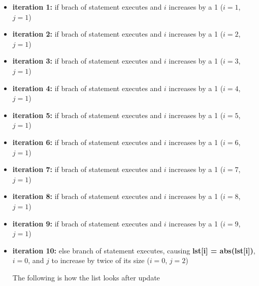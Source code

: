 \documentclass[12pt]{article}
\begin{document}
\begin{enumerate}[a.]
\begin{itemize}
        \begin{itemize}
            \item \textbf{iteration 1:} if brach of statement executes and $i$ increases
            by a 1 ($i = 1$, $j = 1$)
            \item \textbf{iteration 2:} if brach of statement executes and $i$ increases
            by a 1 ($i = 2$, $j = 1$)
            \item \textbf{iteration 3:} if brach of statement executes and $i$ increases
            by a 1 ($i = 3$, $j = 1$)
            \item \textbf{iteration 4:} if brach of statement executes and $i$ increases
            by a 1 ($i = 4$, $j = 1$)
            \item \textbf{iteration 5:} if brach of statement executes and $i$ increases
            by a 1 ($i = 5$, $j = 1$)
            \item \textbf{iteration 6:} if brach of statement executes and $i$ increases
            by a 1 ($i = 6$, $j = 1$)
            \item \textbf{iteration 7:} if brach of statement executes and $i$ increases
            by a 1 ($i = 7$, $j = 1$)
            \item \textbf{iteration 8:} if brach of statement executes and $i$ increases
            by a 1 ($i = 8$, $j = 1$)
            \item \textbf{iteration 9:} if brach of statement executes and $i$ increases
            by a 1 ($i = 9$, $j = 1$)
            \item \textbf{iteration 10:} else branch of statement executes, causing
            \textbf{lst[i] = abs(lst[i])}, $i = 0$, and $j$ to increase by twice of its size ($i = 0$, $j = 2$)

            \bigskip

            The following is how the list looks after update

            \begin{align*}
                [0,0,0,0,0,0,0,0,1,-1,-1,-1,-1,-1,-1,-1]
            \end{align*}


\end{itemize}
\end{itemize}
\end{enumerate}
\end{document}
